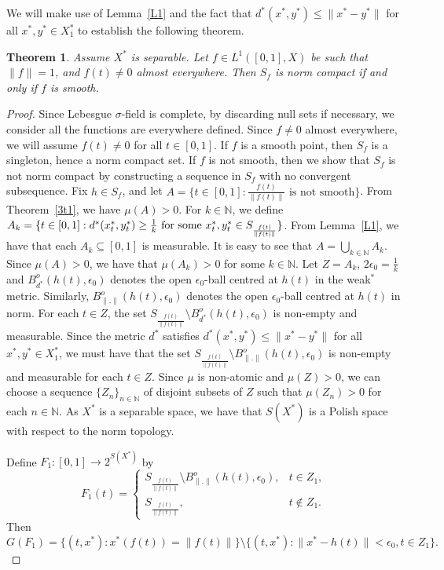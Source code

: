 \documentclass[12pt]{amsart}
\newtheorem{theorem}{Theorem}[section]
\theoremstyle{definition}
\numberwithin{equation}{section}
\begin{document}
    We will make use of Lemma~\ref{L1} and the fact that $d^*(x^*, y^*)\leq \|x^*-y^*\|$ for all $x^*, y^*\in X_{1}^*$ to establish the following theorem.
\begin{theorem}\label{Th316}
    Assume $X^*$ is separable. Let $f\in L^{1}([0,1],X)$ be such that $\|f\|=1$, and $f(t)\neq0$ almost everywhere. Then $S_f$ is norm compact if and only if $f$ is smooth.
\end{theorem}
\begin{proof}
 Since Lebesgue $\sigma$-field is complete, by discarding null sets if necessary, we consider all the functions are everywhere defined. Since $f\neq0$ almost everywhere, we will assume $f(t)\neq0$ for all $t\in [0,1]$. If $f$ is a smooth point, then $S_{f}$ is a singleton, hence a norm compact set. If $f$ is not smooth, then we show that $S_{f}$ is not norm compact by constructing a sequence in $S_{f}$ with no convergent subsequence. Fix $h\in S_{f}$, and let $A=\{t\in[0,1]:{\frac{f(t)}{\|f(t)\|}}\text{ is not smooth}\}$. From Theorem~\ref{3t1}, we have $\mu(A)>0$. For $k\in \mathbb{N}$, we define $A_{k}=\{t\in [0,1]:d^*(x_{t}^*, y_{t}^*)\geq \frac{1}{k}\textnormal{ for some }x_{t}^*, y_{t}^*\in S_{\frac{f(t)}{\|f(t)\|}}\}$. From Lemma~\ref{L1}, we have that each $A_{k}\subseteq [0,1]$ is measurable. It is easy to see that $A=\bigcup_{k\in \mathbb{N}}A_{k}$. Since $\mu(A)>0$, we have that $\mu(A_{k})>0$ for some $k\in \mathbb{N}$. Let $Z=A_{k}$, $2\epsilon_{0}=\frac{1}{k}$ and $B_{d^*}^{o}(h(t), \epsilon_{0})$ denotes the open $\epsilon_{0}$-ball centred at $h(t)$ in the weak$^*$ metric. Similarly, $B_{\|.\|}^{o}(h(t), \epsilon_{0})$ denotes the open $\epsilon_{0}$-ball centred at $h(t)$ in norm. For each $t\in Z$, the set $S_{\frac{f(t)}{\|f(t)\|}}\setminus B_{d^*}^{o}(h(t), \epsilon_{0})$ is non-empty and measurable. Since the metric $d^*$ satisfies $d^*(x^*,y^*)\leq \|x^*-y^*\|$ for all $x^*,y^*\in X_{1}^* $, we must have that the set $S_{\frac{f(t)}{\|f(t)\|}}\setminus B_{\|.\|}^{o}(h(t), \epsilon_{0})$ is non-empty and measurable for each $t\in Z$. Since $\mu$ is non-atomic and $\mu(Z)>0$, we can choose a sequence $\{Z_{n}\}_{n\in \mathbb{N}}$ of disjoint subsets of $Z$ such that $\mu(Z_{n})>0$ for each $n\in \mathbb{N}$. As $X^*$ is a separable space, we have that $S(X^*)$ is a Polish space with respect to the norm topology.

Define $ F_1: [0,1] \to 2^{S(X^*)} $ by
\[
F_{1}(t) =
\begin{cases} 
S_{\frac{f(t)}{\|f(t)\|}}\setminus B_{\|.\|}^{o}(h(t), \epsilon_{0}), & t \in Z_{1} , \\
S_{\frac{f(t)}{\|f(t)\|}}, & t \notin Z_{1}.
\end{cases}
\]
Then
\[
G(F_1) =\{(t,x^*):x^*(f(t))=\|f(t)\|\} \setminus \{(t,x^*):\|x^*-h(t)\|<\epsilon_{0}, t \in Z_1\}.
\]


\end{proof}
\end{document}
